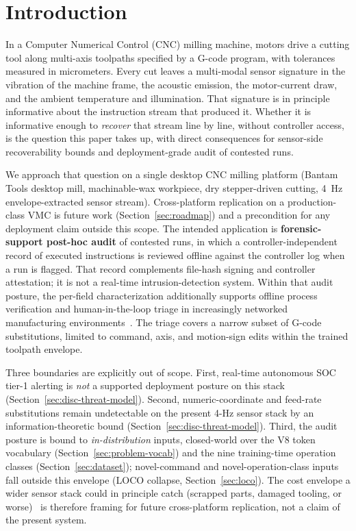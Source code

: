 \documentclass[sensors,article,submit,moreauthors,pdftex]{Definitions/mdpi}
\begin{document}
\section{Introduction}
\label{sec:introduction}

In a Computer Numerical Control (CNC) milling machine, motors drive a cutting tool along multi-axis toolpaths specified by a G-code program, with tolerances measured in micrometers. Every cut leaves a multi-modal sensor signature in the vibration of the machine frame, the acoustic emission, the motor-current draw, and the ambient temperature and illumination. That signature is in principle informative about the instruction stream that produced it. Whether it is informative enough to \emph{recover} that stream line by line, without controller access, is the question this paper takes up, with direct consequences for sensor-side recoverability bounds and deployment-grade audit of contested runs.

We approach that question on a single desktop CNC milling platform (Bantam Tools desktop mill, machinable-wax workpiece, dry stepper-driven cutting, 4~Hz envelope-extracted sensor stream). Cross-platform replication on a production-class VMC is future work (Section~\ref{sec:roadmap}) and a precondition for any deployment claim outside this scope. The intended application is \textbf{forensic-support post-hoc audit} of contested runs, in which a controller-independent record of executed instructions is reviewed offline against the controller log when a run is flagged. That record complements file-hash signing and controller attestation; it is not a real-time intrusion-detection system. Within that audit posture, the per-field characterization additionally supports offline process verification and human-in-the-loop triage in increasingly networked manufacturing environments~\cite{nist2023sp80082,nist2024fmnet,sturm2014cyber,yampolskiy2018security,zhong2017intelligent,kimmell2025cnc}. The triage covers a narrow subset of G-code substitutions, limited to command, axis, and motion-sign edits within the trained toolpath envelope.

Three boundaries are explicitly out of scope. First, real-time autonomous SOC tier-1 alerting is \emph{not} a supported deployment posture on this stack (Section~\ref{sec:disc-threat-model}). Second, numeric-coordinate and feed-rate substitutions remain undetectable on the present 4-Hz sensor stack by an information-theoretic bound (Section~\ref{sec:disc-threat-model}). Third, the audit posture is bound to \emph{in-distribution} inputs, closed-world over the V8 token vocabulary (Section~\ref{sec:problem-vocab}) and the nine training-time operation classes (Section~\ref{sec:dataset}); novel-command and novel-operation-class inputs fall outside this envelope (LOCO collapse, Section~\ref{sec:loco}). The cost envelope a wider sensor stack could in principle catch (scrapped parts, damaged tooling, or worse)~\cite{teti2010advanced,serin2020tool} is therefore framing for future cross-platform replication, not a claim of the present system.
\end{document}
